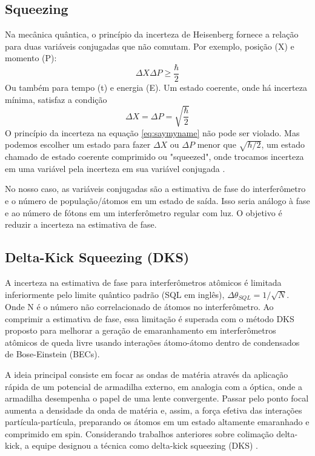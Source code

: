 
\subsection{Squeezing}
Na mecânica quântica, o princípio da incerteza de Heisenberg fornece a relação para duas variáveis conjugadas que não comutam. Por exemplo, posição (X) e momento (P):
\begin{equation}
    \Delta X \Delta P \ge \frac{\hbar}{2}
    \label{eq:saymyname}
\end{equation}
Ou também para tempo (t) e energia (E). Um estado coerente, onde há incerteza mínima, satisfaz a condição 
\begin{equation}
    \Delta X = \Delta P = \sqrt{\frac{\hbar}{2}}
\end{equation}
O princípio da incerteza na equação \ref{eq:saymyname} não pode ser violado. Mas podemos escolher um estado para fazer $\Delta X$ ou $\Delta P$ menor que $\sqrt{\hbar/2}$, um estado chamado de estado coerente comprimido ou "squeezed", onde trocamos incerteza em uma variável pela incerteza em sua variável conjugada
\cite{Ma_2011}.

No nosso caso, as variáveis conjugadas são a estimativa de fase do interferômetro e o número de população/átomos em um estado de saída. Isso seria análogo à fase e ao número de fótons em um interferômetro regular com luz. O objetivo é reduzir a incerteza na estimativa de fase.

\subsection{Delta-Kick Squeezing (DKS)}
A incerteza na estimativa de fase para interferômetros atômicos é limitada inferiormente pelo limite quântico padrão (SQL em inglês), $\Delta \theta_{SQL} = 1/\sqrt{N}$. Onde N é o número não correlacionado de átomos no interferômetro. Ao comprimir a estimativa de fase, essa limitação é superada com o método DKS proposto para melhorar a geração de emaranhamento em interferômetros atômicos de queda livre usando interações átomo-átomo dentro de condensados de Bose-Einstein (BECs).

A ideia principal consiste em focar as ondas de matéria através da aplicação rápida de um potencial de armadilha externo, em analogia com a óptica, onde a armadilha desempenha o papel de uma lente convergente. Passar pelo ponto focal aumenta a densidade da onda de matéria e, assim, a força efetiva das interações partícula-partícula, preparando os átomos em um estado altamente emaranhado e comprimido em spin. Considerando trabalhos anteriores sobre colimação delta-kick, a equipe designou a técnica como delta-kick squeezing (DKS)
\cite{Corgier_2021}.

